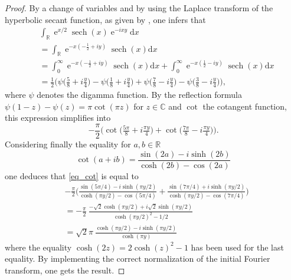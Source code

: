 \documentclass[11pt]{article}
\def\C{\mathbb C}
\def\d{\mathrm d}
\def\R{\mathbb R}
\def\e{\mathop{\mathrm{e}}\nolimits}
\def\sech{\mathop{\mathrm{sech}}\nolimits}
\begin{document}
\begin{proof}
By a change of variables and by using the Laplace transform of the hyperbolic secant function, 
as given by \cite[Eq.~4.9.7]{BatemanI}, one infers that
\begin{align*}
& \int_\R  \e^{x/2} \sech(x)\e^{-ixy}\d x  \\
& = \int_\R \e^{-x(-\frac{1}{2}+iy)}\sech(x) \d x \\
& =  \int_0^\infty \e^{-x(-\frac{1}{2}+iy)}\sech(x) \d x 
+ \int_0^\infty \e^{-x(\frac{1}{2}-iy)}\sech(x) \d x \\
& = \frac{1}{2}
\Big(
\psi\big(\tfrac{5}{8}+i\tfrac{y}{4}\big)-\psi\big(\tfrac{1}{8}+i\tfrac{y}{4}\big)
+ \psi\big(\tfrac{7}{8}-i\tfrac{y}{4}\big)-\psi\big(\tfrac{3}{8}-i\tfrac{y}{4}\big)
\Big),
\end{align*}
where $\psi$ denotes the digamma function. By the reflection formula
$\psi(1-z)-\psi(z)=\pi \cot(\pi z)$ for $z\in \C$ and $\cot$ the cotangent function, this expression simplifies into
\begin{equation}\label{eq_cot}
-\frac{\pi}{2}\Big(\cot\big(\tfrac{5\pi}{8}+i\tfrac{\pi y}{4}\big)
+ \cot\big(\tfrac{7\pi}{8}-i\tfrac{\pi y}{4}\big)\Big).
\end{equation}
Considering finally the equality \cite[Eq.~4.3.58]{AS} for $a,b\in \R$
$$
\cot(a+ib) = \frac{\sin(2a)-i\sinh(2b)}{\cosh(2b)-\cos(2a)}
$$
one deduces that \eqref{eq_cot} is equal to
\begin{align*}
&-\frac{\pi}{2}\bigg(
\frac{\sin(5\pi/4)-i\sinh(\pi y/2)}{\cosh(\pi y/2)-\cos(5\pi/4)}
+\frac{\sin(7\pi/4)+i\sinh(\pi y/2)}{\cosh(\pi y/2)-\cos(7\pi/4)}
\bigg) \\
& = -\frac{\pi}{2}\ \frac{-\sqrt{2}\cosh(\pi y/2)+i\sqrt{2}\sinh(\pi y/2)}{\cosh(\pi y/2)^2-1/2} \\
& = \sqrt{2}\pi \ \frac{\cosh(\pi y/2)-i\sinh(\pi y/2)}{\cosh(\pi y)} 
\end{align*}
where the equality $\cosh(2z)=2\cosh(z)^2-1$ has been used for the last equality.
By implementing the correct normalization of the initial Fourier transform, one gets the result.
\end{proof}
\end{document}
